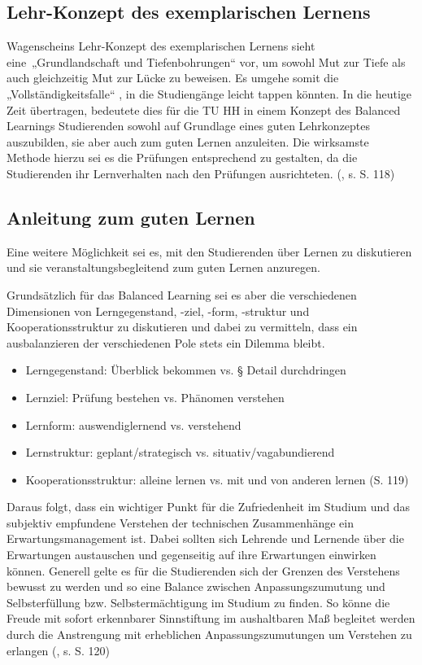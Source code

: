 \documentclass[a4paper, 12 pt]{IEEEtran}
\begin{document}
\subsection{Lehr-Konzept des exemplarischen Lernens}
Wagenscheins Lehr-Konzept des exemplarischen Lernens \cite{Wagenschein:1956} sieht eine „Grundlandschaft und Tiefenbohrungen“ vor, um sowohl Mut zur Tiefe als auch gleichzeitig Mut zur Lücke zu beweisen. Es umgehe somit die „Vollständigkeitsfalle“ \cite{Lehner.2009}, in die Studiengänge leicht tappen könnten. 
In die heutige Zeit übertragen, bedeutete dies für die TU HH in einem Konzept des Balanced Learnings Studierenden sowohl auf Grundlage eines guten Lehrkonzeptes auszubilden, sie aber auch zum guten Lernen anzuleiten. Die wirksamste Methode hierzu sei es die Prüfungen entsprechend zu gestalten, da die Studierenden ihr Lernverhalten nach den Prüfungen ausrichteten. (\cite{Derboven.2014}, s. S. 118)

\subsection{Anleitung zum guten Lernen}
Eine weitere Möglichkeit sei es, mit den Studierenden über Lernen zu diskutieren und sie veranstaltungsbegleitend zum guten Lernen anzuregen.

Grundsätzlich für das Balanced Learning sei es aber die verschiedenen Dimensionen von Lerngegenstand, -ziel, -form, -struktur und Kooperationsstruktur zu diskutieren und dabei zu vermitteln, dass ein ausbalanzieren der verschiedenen Pole stets ein Dilemma bleibt.
\begin{itemize}
\item Lerngegenstand: Überblick bekommen vs. § Detail durchdringen
 \item Lernziel: Prüfung bestehen vs. Phänomen verstehen
 \item Lernform: auswendiglernend vs. verstehend
 \item Lernstruktur: geplant/strategisch vs. situativ/vagabundierend
 \item Kooperationsstruktur: alleine lernen vs. mit und von anderen lernen (S. 119)
    \end{itemize}
Daraus folgt, dass ein wichtiger Punkt für die Zufriedenheit im Studium und das subjektiv empfundene Verstehen der technischen Zusammenhänge ein Erwartungsmanagement ist. Dabei sollten sich Lehrende und Lernende über die Erwartungen austauschen und gegenseitig auf ihre Erwartungen einwirken können. Generell gelte es für die Studierenden sich der Grenzen des Verstehens bewusst zu werden und so eine Balance zwischen Anpassungszumutung und Selbsterfüllung bzw. Selbstermächtigung im Studium zu finden. So könne die Freude mit sofort erkennbarer Sinnstiftung im aushaltbaren Maß begleitet werden durch die Anstrengung mit erheblichen Anpassungszumutungen um Verstehen zu erlangen (\cite{Derboven.2014}, s. S. 120)
\end{document}
